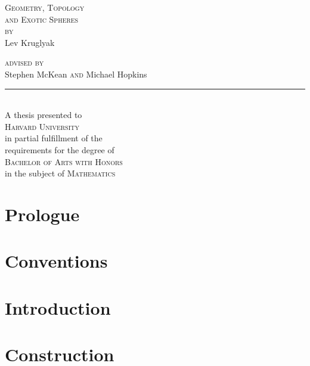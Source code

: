 \documentclass{lkx_thesis}
\begin{document}
\begin{titlepage}
	\begin{center}
		\vfill
		{\HUGE\scshape Geometry, Topology\\ and Exotic Spheres}\\[4em]

		{\Large \scshape by}\\[2em]
		{\huge Lev Kruglyak}\\[3in]

		{
		\Large
		{\scshape advised by\\[1em]}
		{Stephen McKean}
		{\scshape  and}
		{Michael Hopkins}\\[1em]
    \noindent\rule{1in}{0.6pt}\\[1em]
		A thesis presented to \\[1em]
		\textsc{Harvard University}\\[1em]
		in partial fulfillment of the \\
		requirements for the degree of\\[1em]

		\textsc{Bachelor of Arts with Honors}\\
		in the subject of \textsc{Mathematics}
		}
		\vfill
	\end{center}
\end{titlepage}

\lkxtoc

\chapter*{Prologue}\label{chap:prologue}


\chapter*{Conventions}\label{chap:conventions}


\chapter{Introduction}\label{chap:introduction}


\chapter{Construction}\label{chap:construction}

\end{document}
